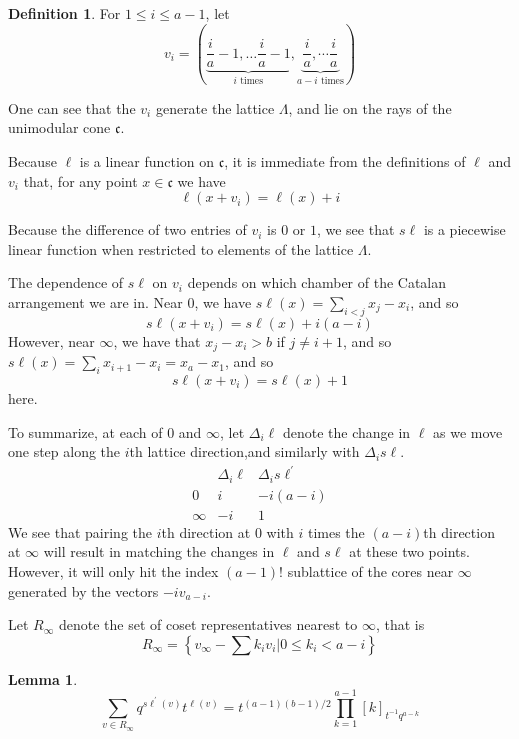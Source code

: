 \documentclass{amsart}[12pt]
\theoremstyle{definition}
\newtheorem{lemma}[dummy]{Lemma}
\newtheorem{definition}[dummy]{Definition}
\newcommand{\sk}{s\ell}
\newcommand{\cone}{\mathfrak{c}}
\begin{document}
\begin{definition}

For $1\leq i\leq a-1$, let $$v_i=\left(\underbrace{\frac{i}{a}-1,\dots \frac{i}{a}-1}_{i \text{ times}},\underbrace{ \frac{i}{a},\dotsm\frac{i}{a}}_{a-i \text{ times}}\right)$$
\end{definition}




One can see that the $v_i$ generate the lattice $\Lambda$, and lie on the rays of the unimodular cone $\cone$.  

Because $\ell$ is a linear function on $\cone$, it is immediate from the definitions of $\ell$ and $v_i$ that, for any point $x\in\cone$ we have  
$$\ell(x+v_i)=\ell(x)+i$$




Because the difference of two entries of $v_i$ is $0$ or $1$, we see that $\sk$ is a piecewise linear function when restricted to elements of the lattice $\Lambda$.


The dependence of $\sk$ on $v_i$ depends on which chamber of the Catalan arrangement we are in.  Near $0$, we have $\sk(x)=\sum_{i<j} x_j-x_i$, and so
$$\sk(x+v_i) = \sk(x)+i(a-i)$$
However, near $\infty$, we have that $x_j-x_i>b$ if $j\neq i+1$, and so $\sk(x)=\sum_i x_{i+1}-x_i=x_a-x_1$, and so
$$\sk(x+v_i)=\sk(x)+1$$
here.

To summarize, at each of $0$ and $\infty$, let $\Delta_i\ell$ denote the change in $\ell$ as we move one step along the $i$th lattice direction,and similarly with $\Delta_i\sk$.  
$$\begin{array}{r|cc}
 & \Delta_i\ell & \Delta_i\sk^\prime \\
\hline
0 & i & -i(a-i) \\
\infty & -i & 1
\end{array}
$$
We see that pairing the $i$th direction at $0$ with $i$ times the $(a-i)$th direction at $\infty$ will result in matching the changes in $\ell$ and $\sk$ at these two points.  However, it will only hit the index $(a-1)!$ sublattice of the cores near $\infty$ generated by the vectors $-iv_{a-i}$.  

Let $R_\infty$ denote the set of coset representatives nearest to $\infty$, that is
$$R_\infty=\left\{v_\infty-\sum k_iv_i \big| 0\leq k_i<a-i\right\}$$

\begin{lemma}
$$\sum_{v\in R_\infty} q^{\sk^\prime(v)}t^{\ell(v)}=t^{(a-1)(b-1)/2}\prod_{k=1}^{a-1} [k]_{t^{-1}q^{a-k}}$$
\end{lemma}
\end{document}
